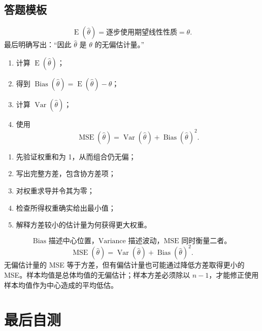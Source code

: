 \documentclass[11pt,a4paper]{article}
\newcommand{\E}{\operatorname{E}}
\newcommand{\Var}{\operatorname{Var}}
\newcommand{\Bias}{\operatorname{Bias}}
\newcommand{\MSE}{\operatorname{MSE}}
\begin{document}
\subsection{答题模板}

\begin{methodbox}[证明某估计量无偏]
\[
  \E(\hat\theta)
  =
  \text{逐步使用期望线性性质}
  =
  \theta.
\]
最后明确写出：“因此 $\hat\theta$ 是 $\theta$ 的无偏估计量。”
\end{methodbox}

\begin{methodbox}
\begin{enumerate}
  \item 计算 $\E(\hat\theta)$；
  \item 得到 $\Bias(\hat\theta)=\E(\hat\theta)-\theta$；
  \item 计算 $\Var(\hat\theta)$；
  \item 使用
  \[
    \MSE(\hat\theta)
    =
    \Var(\hat\theta)+\Bias(\hat\theta)^2.
  \]
\end{enumerate}
\end{methodbox}

\begin{methodbox}[合并两个无偏估计量]
\begin{enumerate}
  \item 先验证权重和为 1，从而组合仍无偏；
  \item 写出完整方差，包含协方差项；
  \item 对权重求导并令其为零；
  \item 检查所得权重确实给出最小值；
  \item 解释方差较小的估计量为何获得更大权重。
\end{enumerate}
\end{methodbox}

\begin{summarybox}[第 2 部分的核心]
\[
  \boxed{
  \text{Bias 描述中心位置，Variance 描述波动，MSE 同时衡量二者。}
  }
\]
\[
  \boxed{
  \MSE(\hat\theta)
  =
  \Var(\hat\theta)+\Bias(\hat\theta)^2.
  }
\]
无偏估计量的 MSE 等于方差，但有偏估计量也可能通过降低方差取得更小的 MSE。样本均值是总体均值的无偏估计；样本方差必须除以 $n-1$，才能修正使用样本均值作为中心造成的平均低估。
\end{summarybox}

\section{最后自测}
\end{document}
